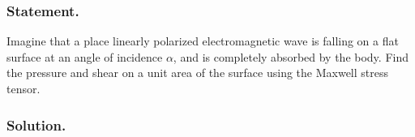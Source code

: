\subsubsection{Statement.}

Imagine that a place linearly polarized electromagnetic wave is falling on a flat surface at an angle of incidence $\alpha$, and is completely absorbed by the body.  Find the pressure and shear on a unit area of the surface using the Maxwell stress tensor.

\subsubsection{Solution.}

